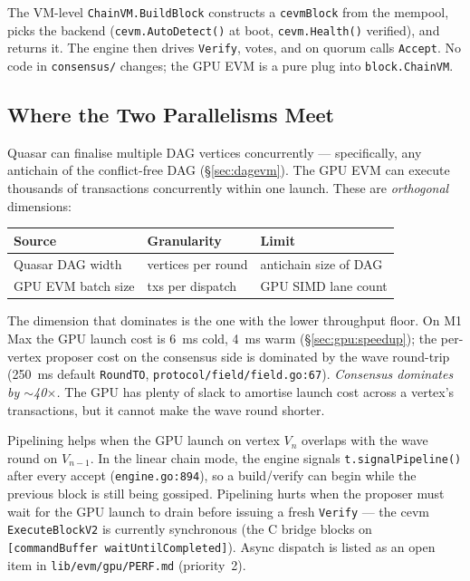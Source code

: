 The VM-level \texttt{ChainVM.BuildBlock} constructs a \texttt{cevmBlock}
from the mempool, picks the backend (\texttt{cevm.AutoDetect()} at boot,
\texttt{cevm.Health()} verified), and returns it. The engine then drives
\texttt{Verify}, votes, and on quorum calls \texttt{Accept}. No code in
\texttt{consensus/} changes; the GPU EVM is a pure plug into
\texttt{block.ChainVM}.

\subsection{Where the Two Parallelisms Meet}
\label{sec:cevm-parallelism}

Quasar can finalise multiple DAG vertices concurrently --- specifically,
any antichain of the conflict-free DAG (\S\ref{sec:dagevm}). The GPU EVM
can execute thousands of transactions concurrently within one launch.
These are \emph{orthogonal} dimensions:

\begin{table}[h]
\centering
\small
\begin{tabular}{lll}
\toprule
\textbf{Source} & \textbf{Granularity} & \textbf{Limit} \\
\midrule
Quasar DAG width    & vertices per round  & antichain size of DAG \\
GPU EVM batch size  & txs per dispatch    & GPU SIMD lane count \\
\bottomrule
\end{tabular}
\end{table}

The dimension that dominates is the one with the lower throughput floor.
On M1 Max the GPU launch cost is \SI{6}{\milli\second} cold,
\SI{4}{\milli\second} warm (\S\ref{sec:gpu:speedup}); the per-vertex
proposer cost on the consensus side is dominated by the wave round-trip
(\SI{250}{\milli\second} default \texttt{RoundTO},
\texttt{protocol/field/field.go:67}). \emph{Consensus dominates by
$\sim$40$\times$.} The GPU has plenty of slack to amortise launch cost
across a vertex's transactions, but it cannot make the wave round
shorter.

Pipelining helps when the GPU launch on vertex $V_n$ overlaps with the
wave round on $V_{n-1}$. In the linear chain mode, the engine signals
\texttt{t.signalPipeline()} after every accept (\texttt{engine.go:894}),
so a build/verify can begin while the previous block is still being
gossiped. Pipelining hurts when the proposer must wait for the GPU
launch to drain before issuing a fresh \texttt{Verify} --- the cevm
\texttt{ExecuteBlockV2} is currently synchronous (the C bridge blocks
on \texttt{[commandBuffer waitUntilCompleted]}). Async dispatch is
listed as an open item in \texttt{lib/evm/gpu/PERF.md} (priority~2).

